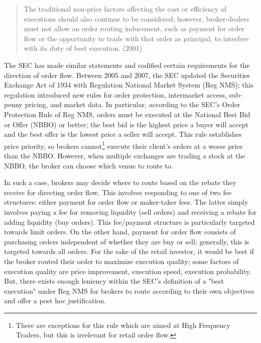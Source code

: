 \documentclass[12pt,a4paper]{article}
\begin{document}
	
	\begin{quote}
		The traditional non-price factors affecting the cost or efficiency of executions should also continue to be considered; however, broker-dealers must not allow an order routing inducement, such as payment for order flow or the opportunity to trade with that order as principal, to interfere with its duty of best execution. (2001)
	\end{quote}
	The SEC has made similar statements and codified certain requirements for the direction of order flow. Between 2005 and 2007, the SEC updated the Securities Exchange Act of 1934 with Regulation National Market System (Reg NMS); this regulation introduced new rules for order protection, intermarket access, sub-penny pricing, and market data. In particular, according to the SEC's Order Protection Rule of Reg NMS, orders must be executed at the National Best Bid or Offer (NBBO) or better; the best bid is the highest price a buyer will accept and the best offer is the lowest price a seller will accept. This rule establishes price priority, so brokers cannot\footnote{ There are exceptions for this rule which are aimed at High Frequency Traders, but this is irrelevant for retail order flow.} execute their client's orders at a worse price than the NBBO. However, when multiple exchanges are trading a stock at the NBBO, the broker can choose which venue to route to. 
	
	In such a case, brokers may decide where to route based on the rebate they receive for directing order flow. This involves responding to one of two fee structures: either payment for order flow or maker-taker fees. The latter simply involves paying a fee for removing liquidity (sell orders) and receiving a rebate for adding liquidity (buy orders). This fee/payment structure is particularly targeted towards limit orders. On the other hand, payment for order flow consists of purchasing orders independent of whether they are buy or sell; generally, this is targeted towards all orders. For the sake of the retail investor, it would be best if the broker routed their order to maximize execution quality; some factors of execution quality are price improvement, execution speed, execution probability. But, there exists enough leniency within the SEC's definition of a "best execution" under Reg NMS for brokers to route according to their own objectives and offer a post hoc justification. 
	
\end{document}
